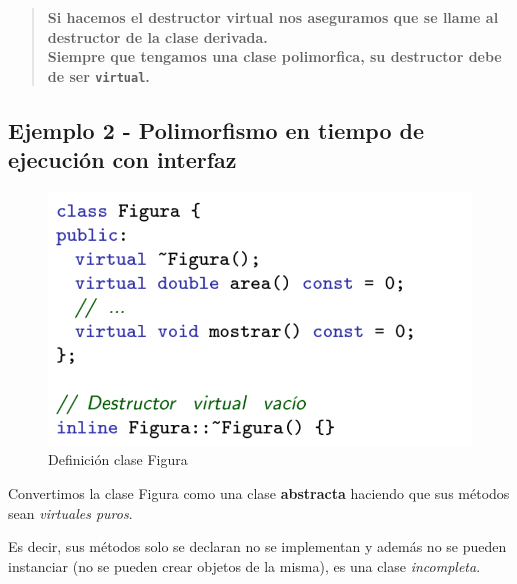 \begin{center}
	\begin{quote}
	\textbf{Si hacemos el destructor virtual nos aseguramos que se llame al destructor de la clase derivada.\\
		Siempre que tengamos una clase polimorfica, su destructor debe de ser \texttt{virtual}.}

\end{quote}
\end{center}
\newpage
\subsection{Ejemplo 2 - Polimorfismo en tiempo de ejecución con interfaz}
\begin{figure}[h]
	\begin{center}
		\includegraphics[width=\textwidth]{Imagenes/poli5.png}
		\caption{Definición clase Figura}
	\end{center}
\end{figure}

Convertimos la clase Figura como una clase \textbf{abstracta} haciendo que sus métodos sean \textit{virtuales puros}.

Es decir, sus métodos solo se declaran no se implementan y además no se pueden instanciar (no se pueden crear objetos de la misma), es una clase \textit{incompleta}.

